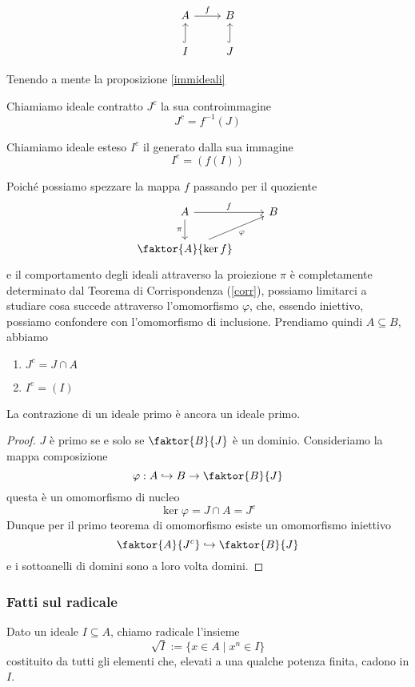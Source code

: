 \begin{multicols}{2}
\[ \begin{tikzcd}
A \arrow{r}{f}  & B \\
I \arrow[swap, hook]{u}{} & J \arrow[swap, hook]{u}{}
\end{tikzcd} \]

Tenendo a mente la proposizione \ref{immideali}

\begin{definition}
	Chiamiamo ideale contratto $ J^c $ la sua controimmagine $$  J^c = f^{-1}(J)  $$
\end{definition}
\begin{definition}
	Chiamiamo ideale esteso $ I^e $ il generato dalla sua immagine
	\[I^e = \left(f(I)\right) \]
\end{definition}

Poiché possiamo spezzare la mappa $ f $ passando per il quoziente
\[ \begin{tikzcd}
A \arrow{r}{f} \arrow[swap]{d}{\pi} & B \\
\faktor{A}{\ker f} \arrow[swap]{ru}{\varphi}
\end{tikzcd} \]
e il comportamento degli ideali attraverso la proiezione $ \pi $ è completamente determinato dal Teorema di Corrispondenza (\ref{corr}), possiamo limitarci a studiare cosa succede attraverso l'omomorfismo $ \varphi $, che, essendo iniettivo, possiamo confondere con l'omomorfismo di inclusione. Prendiamo quindi $ A \subseteq B $, abbiamo
\begin{enumerate}
	\item $ J^c = J \cap A $
	\item $ I^e = (I) $
\end{enumerate}

\begin{prop}\label{contr}
	La contrazione di un ideale primo è ancora un ideale primo.
\end{prop}
\begin{proof}
	$ J $ è primo se e solo se $ \faktor{B}{J} $ è un dominio. Consideriamo la mappa composizione 
	\[ \varphi : A \hookrightarrow B \to \faktor{B}{J} \]
	questa è un omomorfismo di nucleo
	\[ \ker\varphi = J \cap A = J^c \]
	Dunque per il primo teorema di omomorfismo esiste un omomorfismo iniettivo
	\[ \faktor{A}{J^c} \hookrightarrow \faktor{B}{J} \]
	e i sottoanelli di domini sono a loro volta domini.
\end{proof}

\subsubsection{Fatti sul radicale}
\begin{definition} Dato un ideale $ I \subseteq A $, chiamo radicale l'insieme
	$$  \sqrt{I}:= \{ x \in A \mid x^n \in I \}  $$
	costituito da tutti gli elementi che, elevati a una qualche potenza finita, cadono in $ I $.
\end{definition}


\end{multicols}
